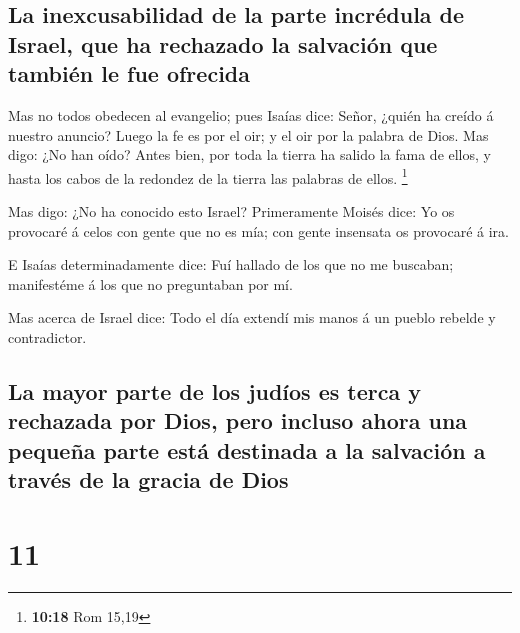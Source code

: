 \hypertarget{la-inexcusabilidad-de-la-parte-incruxe9dula-de-israel-que-ha-rechazado-la-salvaciuxf3n-que-tambiuxe9n-le-fue-ofrecida}{%
\subsection{La inexcusabilidad de la parte incrédula de Israel, que ha
rechazado la salvación que también le fue
ofrecida}\label{la-inexcusabilidad-de-la-parte-incruxe9dula-de-israel-que-ha-rechazado-la-salvaciuxf3n-que-tambiuxe9n-le-fue-ofrecida}}

 Mas no todos obedecen al evangelio; pues Isaías dice:
Señor, ¿quién ha creído á nuestro anuncio?  Luego la fe
es por el oir; y el oir por la palabra de Dios.  Mas
digo: ¿No han oído? Antes bien, por toda la tierra ha salido la fama de
ellos, y hasta los cabos de la redondez de la tierra las palabras de
ellos. \footnote{\textbf{10:18} Rom 15,19}

 Mas digo: ¿No ha conocido esto Israel? Primeramente
Moisés dice: Yo os provocaré á celos con gente que no es mía; con gente
insensata os provocaré á ira.

 E Isaías determinadamente dice: Fuí hallado de los que
no me buscaban; manifestéme á los que no preguntaban por mí.

 Mas acerca de Israel dice: Todo el día extendí mis manos
á un pueblo rebelde y contradictor.

\hypertarget{la-mayor-parte-de-los-juduxedos-es-terca-y-rechazada-por-dios-pero-incluso-ahora-una-pequeuxf1a-parte-estuxe1-destinada-a-la-salvaciuxf3n-a-travuxe9s-de-la-gracia-de-dios}{%
\subsection{La mayor parte de los judíos es terca y rechazada por Dios,
pero incluso ahora una pequeña parte está destinada a la salvación a
través de la gracia de
Dios}\label{la-mayor-parte-de-los-juduxedos-es-terca-y-rechazada-por-dios-pero-incluso-ahora-una-pequeuxf1a-parte-estuxe1-destinada-a-la-salvaciuxf3n-a-travuxe9s-de-la-gracia-de-dios}}

\hypertarget{section-10}{%
\section{11}\label{section-10}}

